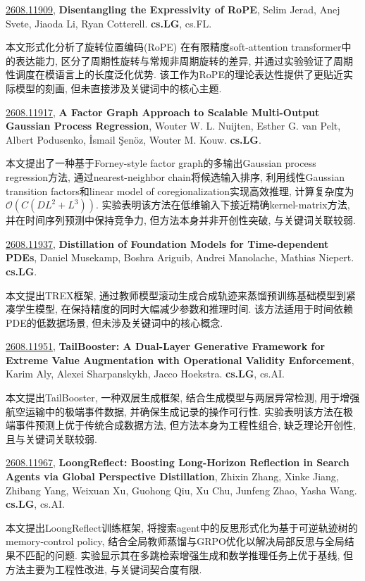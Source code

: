 \documentclass[9pt, a4paper]{article}
\theoremstyle{plain}
\theoremstyle{definition}
\theoremstyle{remark}
\newcommand{\arxivwithtarget}[3]{\hypertarget{#1}{}\href{https://arxiv.org/abs/#1}{#1}, \textbf{\textcolor{arxivblue}{#2}}, #3. }
\begin{document}
\arxivwithtarget{2608.11909}{Disentangling the Expressivity of RoPE}{Selim Jerad, Anej Svete, Jiaoda Li, Ryan Cotterell}\textbf{cs.LG}, cs.FL.

本文形式化分析了旋转位置编码(RoPE) 在有限精度soft-attention transformer中的表达能力, 区分了周期性旋转与常规非周期旋转的差异, 并通过实验验证了周期性调度在模语言上的长度泛化优势. 该工作为RoPE的理论表达性提供了更贴近实际模型的刻画, 但未直接涉及关键词中的核心主题.


\arxivwithtarget{2608.11917}{A Factor Graph Approach to Scalable Multi-Output Gaussian Process Regression}{Wouter W. L. Nuijten, Esther G. van Pelt, Albert Podusenko, İsmail Şenöz, Wouter M. Kouw}\textbf{cs.LG}.

本文提出了一种基于Forney-style factor graph的多输出Gaussian process regression方法, 通过nearest-neighbor chain将候选输入排序, 利用线性Gaussian transition factors和linear model of coregionalization实现高效推理, 计算复杂度为$\mathcal{O}(C(DL^2 + L^3))$. 实验表明该方法在低维输入下接近精确kernel-matrix方法, 并在时间序列预测中保持竞争力, 但方法本身并非开创性突破, 与关键词关联较弱.


\arxivwithtarget{2608.11937}{Distillation of Foundation Models for Time-dependent PDEs}{Daniel Musekamp, Boshra Ariguib, Andrei Manolache, Mathias Niepert}\textbf{cs.LG}.

本文提出TREX框架, 通过教师模型滚动生成合成轨迹来蒸馏预训练基础模型到紧凑学生模型, 在保持精度的同时大幅减少参数和推理时间. 该方法适用于时间依赖PDE的低数据场景, 但未涉及关键词中的核心概念.


\arxivwithtarget{2608.11951}{TailBooster: A Dual-Layer Generative Framework for Extreme Value Augmentation with Operational Validity Enforcement}{Karim Aly, Alexei Sharpanskykh, Jacco Hoekstra}\textbf{cs.LG}, cs.AI.

本文提出TailBooster, 一种双层生成框架, 结合生成模型与两层异常检测, 用于增强航空运输中的极端事件数据, 并确保生成记录的操作可行性. 实验表明该方法在极端事件预测上优于传统合成数据方法, 但方法本身为工程性组合, 缺乏理论开创性, 且与关键词关联较弱.


\arxivwithtarget{2608.11967}{LoongReflect: Boosting Long-Horizon Reflection in Search Agents via Global Perspective Distillation}{Zhixin Zhang, Xinke Jiang, Zhibang Yang, Weixuan Xu, Guohong Qiu, Xu Chu, Junfeng Zhao, Yasha Wang}\textbf{cs.LG}, cs.AI.

本文提出LoongReflect训练框架, 将搜索agent中的反思形式化为基于可逆轨迹树的memory-control policy, 结合全局教师蒸馏与GRPO优化以解决局部反思与全局结果不匹配的问题. 实验显示其在多跳检索增强生成和数学推理任务上优于基线, 但方法主要为工程性改进, 与关键词契合度有限.
\end{document}
